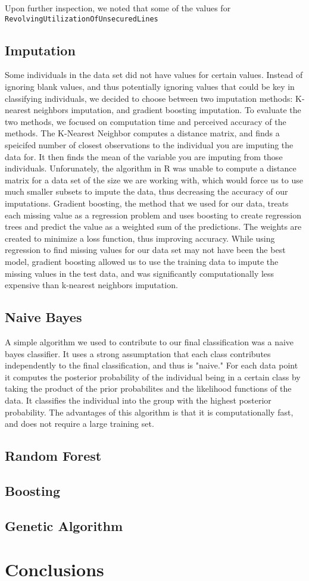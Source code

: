 \documentclass[11pt, oneside]{article}   	%
\begin{document}
	Upon further inspection, we noted that some of the values for \tt RevolvingUtilizationOfUnsecuredLines
	\subsection{Imputation}
	Some individuals in the data set did not have values for certain values. Instead of ignoring blank values, and thus potentially ignoring values that could be key in classifying individuals, we decided to choose between two imputation methods: K-nearest neighbors imputation, and gradient boosting imputation. To evaluate the two methods, we focused on computation time and perceived accuracy of the methods. The K-Nearest Neighbor computes a distance matrix, and finds a speicifed number of closest observations to the individual you are imputing the data for. It then finds the mean of the variable you are imputing from those individuals. Unforunately, the algorithm in R was unable to compute a distance matrix for a data set of the size we are working with, which would force us to use much smaller subsets to impute the data, thus decreasing the accuracy of our imputations. Gradient boosting, the method that we used for our data, treats each missing value as a regression problem and uses boosting to create regression trees and predict the value as a weighted sum of the predictions. The weights are created to minimize a loss function, thus improving accuracy. While using regression to find missing values for our data set may not have been the best model, gradient boosting allowed us to use the training data to impute the missing values in the test data, and was significantly computationally less expensive than k-nearest neighbors imputation. 
	\subsection{Naive Bayes}
	A simple algorithm we used to contribute to our final classification was a naive bayes classifier. It uses a strong assumptation that each class contributes independently to the final classification, and thus is "naive." For each data point it computes the posterior probability of the individual being in a certain class by taking the product of the prior probabilites and the likelihood functions of the data. It classifies the individual into the group with the highest posterior probability. The advantages of this algorithm is that it is computationally fast, and does not require a large training set. 
	\subsection{Random Forest}
	\subsection{Boosting}
	\subsection{Genetic Algorithm}
\section{Conclusions}
\end{document}

